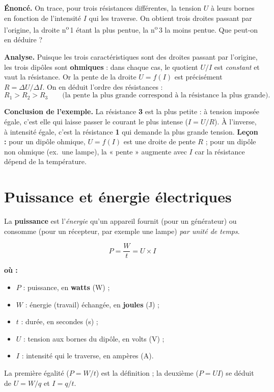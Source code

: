 \documentclass[11pt,a4paper]{article}
\newenvironment{ou}{%
  \par\smallskip\noindent\textbf{où :}\nopagebreak
  \begin{itemize}[leftmargin=1.8em,topsep=2pt,itemsep=1.5pt,parsep=0pt]}%
  {\end{itemize}}
\begin{document}
\begin{exemple}
\textbf{Énoncé.} On trace, pour trois résistances différentes, la tension $U$ à leurs bornes en
fonction de l'intensité $I$ qui les traverse. On obtient trois droites passant par l'origine, la
droite n\textsuperscript{o}\,1 étant la plus pentue, la n\textsuperscript{o}\,3 la moins pentue.
Que peut-on en déduire ?

\smallskip
\textbf{Analyse.} Puisque les trois caractéristiques sont des droites passant par l'origine, les
trois dipôles sont \textbf{ohmiques} : dans chaque cas, le quotient $U/I$ est \emph{constant} et vaut
la résistance. Or la pente de la droite $U=f(I)$ est précisément $R=\Delta U/\Delta I$. On en déduit
l'ordre des résistances :
\[ R_1 > R_2 > R_3 \qquad\text{(la pente la plus grande correspond à la résistance la plus grande).} \]

\textbf{Conclusion de l'exemple.} La résistance \textbf{3} est la plus petite : à tension imposée
égale, c'est elle qui laisse passer le courant le plus intense ($I=U/R$). À l'inverse, à intensité
égale, c'est la résistance \textbf{1} qui demande la plus grande tension. \textbf{Leçon :} pour un
dipôle ohmique, $U=f(I)$ est une droite de pente $R$ ; pour un dipôle non ohmique (ex.\ une lampe),
la « pente » augmente avec $I$ car la résistance dépend de la température.
\end{exemple}

\section{Puissance et énergie électriques}
\begin{definition}
La \textbf{puissance} est l'\emph{énergie} qu'un appareil fournit (pour un générateur) ou consomme
(pour un récepteur, par exemple une lampe) \emph{par unité de temps}.
\end{definition}

\begin{formule}
\[ \boxed{\,P = \dfrac{W}{t} = U\times I\,} \]
\begin{ou}
  \item $P$ : puissance, en \textbf{watts} (\si{\watt}) ;
  \item $W$ : énergie (travail) échangée, en \textbf{joules} (\si{\joule}) ;
  \item $t$ : durée, en secondes (\si{\second}) ;
  \item $U$ : tension aux bornes du dipôle, en volts (\si{\volt}) ;
  \item $I$ : intensité qui le traverse, en ampères (\si{\ampere}).
\end{ou}
La première égalité ($P=W/t$) est la définition ; la deuxième ($P=UI$) se déduit de $U=W/q$ et $I=q/t$.
\end{formule}
\end{document}
